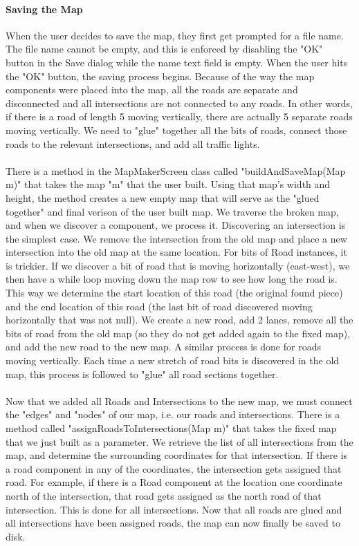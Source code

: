 \documentclass[a4paper,11pt,titlepage]{article}
\begin{document}
\paragraph{Saving the Map}
When the user decides to save the map, they first get prompted for a file name. The file name cannot be empty, and this is enforced by disabling the "OK" button in the Save dialog while the name text field is empty. When the user hits the "OK" button, the saving process begins. Because of the way the map components were placed into the map, all the roads are separate and disconnected and all intersections are not connected to any roads. In other words, if there is a road of length 5 moving vertically, there are actually 5 separate roads moving vertically. We need to "glue" together all the bits of roads, connect those roads to the relevant intersections, and add all traffic lights. 
\paragraph{}
There is a method in the MapMakerScreen class called "buildAndSaveMap(Map m)" that takes the map "m" that the user built. Using that map's width and height, the method creates a new empty map that will serve as the "glued together" and final verison of the user built map. We traverse the broken map, and when we discover a component, we process it. Discovering an intersection is the simplest case. We remove the intersection from the old map and place a new intersection into the old map at the same location. For bits of Road instances, it is trickier. If we discover a bit of road that is moving horizontally (east-west), we then have a while loop moving down the map row to see how long the road is. This way we determine the start location of this road (the original found piece) and the end location of this road (the last bit of road discovered moving horizontally that was not null). We create a new road, add 2 lanes, remove all the bits of road from the old map (so they do not get added again to the fixed map), and add the new road to the new map. A similar process is done for roads moving vertically. Each time a new stretch of road bits is discovered in the old map, this process is followed to "glue" all road sections together.
\paragraph{}
Now that we added all Roads and Intersections to the new map, we must connect the "edges" and "nodes" of our map, i.e. our roads and intersections. There is a method called "assignRoadsToIntersections(Map m)" that takes the fixed map that we just built as a parameter. We retrieve the list of all intersections from the map, and determine the surrounding coordinates for that intersection. If there is a road component in any of the coordinates, the intersection gets assigned that road. For example, if there is a Road component at the location one coordinate north of the intersection, that road gets assigned as the north road of that intersection. This is done for all intersections. Now that all roads are glued and all intersections have been assigned roads, the map can now finally be saved to disk.
\end{document}
